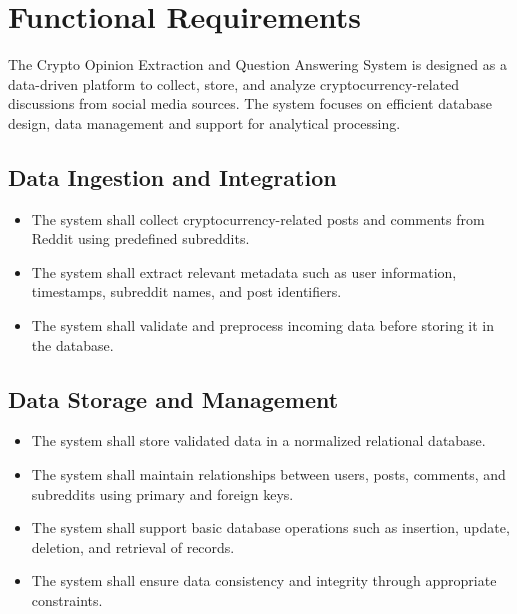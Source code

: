 \section{Functional Requirements}

The Crypto Opinion Extraction and Question Answering System is designed as a data-driven platform to collect, store, and analyze cryptocurrency-related discussions from social media sources. The system focuses on efficient database design, data management and support for analytical processing.

\subsection{Data Ingestion and Integration}

\begin{itemize}
    \item The system shall collect cryptocurrency-related posts and comments from Reddit using predefined subreddits.
    \item The system shall extract relevant metadata such as user information, timestamps, subreddit names, and post identifiers.
    \item The system shall validate and preprocess incoming data before storing it in the database.
\end{itemize}

\subsection{Data Storage and Management}

\begin{itemize}
    \item The system shall store validated data in a normalized relational database.
    \item The system shall maintain relationships between users, posts, comments, and subreddits using primary and foreign keys.
    \item The system shall support basic database operations such as insertion, update, deletion, and retrieval of records.
    \item The system shall ensure data consistency and integrity through appropriate constraints.
\end{itemize}


